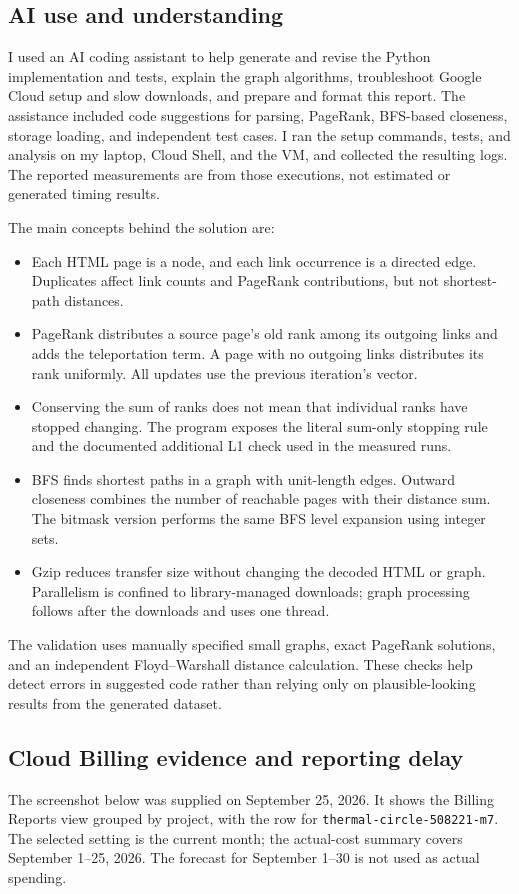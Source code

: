 \documentclass[10pt,letterpaper]{article}
\begin{document}
\subsection{AI use and understanding}
I used an AI coding assistant to help generate and revise the Python
implementation and tests, explain the graph algorithms, troubleshoot Google
Cloud setup and slow downloads, and prepare and format this report. The
assistance included code suggestions for parsing, PageRank, BFS-based closeness,
storage loading, and independent test cases. I ran the setup commands, tests,
and analysis on my laptop, Cloud Shell, and the VM, and collected the resulting
logs. The reported measurements are from those executions, not estimated or
generated timing results.

The main concepts behind the solution are:
\begin{itemize}
\item Each HTML page is a node, and each link occurrence is a directed edge.
Duplicates affect link counts and PageRank contributions, but not shortest-path
distances.
\item PageRank distributes a source page's old rank among its outgoing links
and adds the teleportation term. A page with no outgoing links distributes its
rank uniformly. All updates use the previous iteration's vector.
\item Conserving the sum of ranks does not mean that individual ranks have
stopped changing. The program exposes the literal sum-only stopping rule and
the documented additional L1 check used in the measured runs.
\item BFS finds shortest paths in a graph with unit-length edges. Outward
closeness combines the number of reachable pages with their distance sum.
The bitmask version performs the same BFS level expansion using integer sets.
\item Gzip reduces transfer size without changing the decoded HTML or graph.
Parallelism is confined to library-managed downloads; graph processing follows
after the downloads and uses one thread.
\end{itemize}
The validation uses manually specified small graphs, exact PageRank solutions,
and an independent Floyd--Warshall distance calculation. These checks help
detect errors in suggested code rather than relying only on plausible-looking
results from the generated dataset.

\clearpage
\subsection{Cloud Billing evidence and reporting delay}
The screenshot below was supplied on September 25, 2026. It shows the Billing
Reports view grouped by project, with the row for
\texttt{thermal-circle-508221-m7}. The selected setting is the current month;
the actual-cost summary covers September 1--25, 2026. The forecast for
September 1--30 is not used as actual spending.
\end{document}
